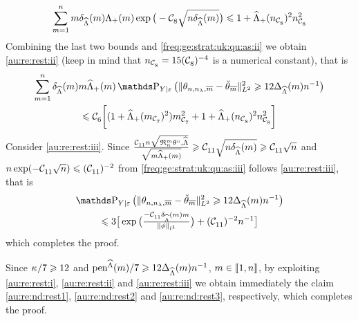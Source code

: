\begin{pro}
  \begin{displaymath}
  \sum_{\Di=1}^{\ssY}\Di\cmeiSv\miSv\exp\big(-\cst{8}\sqrt{\ssY\cmeiSv}\big)\leq 1+\meiSv[\ssY_{\cst{8}}]^2\ssY_{\cst{8}}^2
 \end{displaymath}
 Combining the last two bounds and  \ref{freq:ge:strat:uk:qu:as:ii} we
 obtain \ref{au:re:rest:ii} (keep in mind that $\ssY_{\cst{8}}=15(\cst{8})^{-4}$ is a numerical constant), that is 
 \begin{multline*}
 \sum_{\Di=1}^{\ssY}\cmeiSv \Di \meiSv\P_{Y \vert \epsilon}\big(\VnormLp{\hxdfPr-\dxdfPr}^2 \geq 12\DiepenSv\ssY^{-1}\big)\\
 \leq\cst{6}\bigg[(1+\meiSv[\Di_{\cst{7}}]^2)\Di_{\cst{7}}^2+1+\meiSv[\ssY_{\cst{8}}]^2\ssY_{\cst{8}}^2\bigg]
 \end{multline*}
 Consider \ref{au:re:rest:iii}. Since
 $\tfrac{\cst{11}\ssY\sqrt{\daRa{\Di}{\xdf,\eiSv}}}{\sqrt{\Di\meiSv}}\geq\cst{11}\sqrt{\ssY\cmeiSv}\geq\cst{11}\sqrt{\ssY}$
 and $\ssY\exp(-\cst{11}\sqrt{\ssY})\leq(\cst{11})^{-2}$ 
 from  \ref{freq:ge:strat:uk:qu:as:iii}  follows \ref{au:re:rest:iii}, that is 
 \begin{multline*}
 \P_{Y \vert \epsilon}\big(\VnormLp{\hxdfPr-\dxdfPr}^2 \geq 12\DiepenSv\ssY^{-1}\big)\\
 \leq 3 \big[\exp\big(\tfrac{-\cst{11}\cmeiSv\Di}{\Vnormlp[1]{\fydf}}\big)
     +(\cst{11})^{-2}\ssY^{-1}\big] 
 \end{multline*}
 which  completes the proof.\proEnd\end{pro}
\begin{pro}
  Since $\cpen/7\geq 12$ and $\peneSv/7\geq12\DipeneSv\ssY^{-1}$,
  $\Di\in\nset{1,n}$, by exploiting 
  \ref{au:re:rest:i}, \ref{au:re:rest:ii} and \ref{au:re:rest:iii} we
  obtain immediately the claim \ref{au:re:nd:rest1},
  \ref{au:re:nd:rest2} and \ref{au:re:nd:rest3}, respectively, which  completes the proof.
\proEnd\end{pro}

